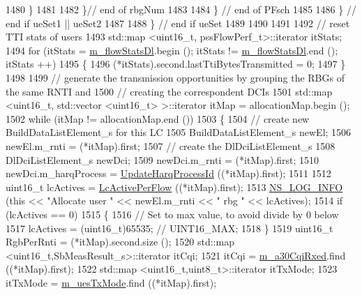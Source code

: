 \begin{DoxyCode}
1480                     \}
1481          
1482                 \}\textcolor{comment}{// end of rbgNum}
1483         
1484             \} \textcolor{comment}{// end of PFsch}
1485 
1486         \} \textcolor{comment}{// end if ueSet1 || ueSet2}
1487     
1488     \} \textcolor{comment}{// end if ueSet}
1489 
1490 
1491 
1492   \textcolor{comment}{// reset TTI stats of users}
1493   std::map <uint16\_t, pssFlowPerf\_t>::iterator itStats;
1494   \textcolor{keywordflow}{for} (itStats = \hyperlink{classns3_1_1PssFfMacScheduler_add144474dc7bd9d89b93ff14bc8d27c9}{m\_flowStatsDl}.begin (); itStats != \hyperlink{classns3_1_1PssFfMacScheduler_add144474dc7bd9d89b93ff14bc8d27c9}{m\_flowStatsDl}.end (); itStats
      ++)
1495     \{
1496       (*itStats).second.lastTtiBytesTransmitted = 0;
1497     \}
1498 
1499   \textcolor{comment}{// generate the transmission opportunities by grouping the RBGs of the same RNTI and}
1500   \textcolor{comment}{// creating the correspondent DCIs}
1501   std::map <uint16\_t, std::vector <uint16\_t> >::iterator itMap = allocationMap.begin ();
1502   \textcolor{keywordflow}{while} (itMap != allocationMap.end ())
1503     \{
1504       \textcolor{comment}{// create new BuildDataListElement\_s for this LC}
1505       BuildDataListElement\_s newEl;
1506       newEl.m\_rnti = (*itMap).first;
1507       \textcolor{comment}{// create the DlDciListElement\_s}
1508       DlDciListElement\_s newDci;
1509       newDci.m\_rnti = (*itMap).first;
1510       newDci.m\_harqProcess = \hyperlink{classns3_1_1PssFfMacScheduler_a5c5fbf9993def2ae6cf974ae81bc0ddb}{UpdateHarqProcessId} ((*itMap).first);
1511 
1512       uint16\_t lcActives = \hyperlink{classns3_1_1PssFfMacScheduler_afa94be0f9d6a6f6ce3aee86abf764e27}{LcActivePerFlow} ((*itMap).first);
1513       \hyperlink{group__logging_gafbd73ee2cf9f26b319f49086d8e860fb}{NS\_LOG\_INFO} (\textcolor{keyword}{this} << \textcolor{stringliteral}{"Allocate user "} << newEl.m\_rnti << \textcolor{stringliteral}{" rbg "} << lcActives);
1514       \textcolor{keywordflow}{if} (lcActives == 0)
1515         \{
1516           \textcolor{comment}{// Set to max value, to avoid divide by 0 below}
1517           lcActives = (uint16\_t)65535; \textcolor{comment}{// UINT16\_MAX;}
1518         \}
1519       uint16\_t RgbPerRnti = (*itMap).second.size ();
1520       std::map <uint16\_t,SbMeasResult\_s>::iterator itCqi;
1521       itCqi = \hyperlink{classns3_1_1PssFfMacScheduler_ab1bc511b7c55ead9b2e8ff1e0d4b0e3b}{m\_a30CqiRxed}.find ((*itMap).first);
1522       std::map <uint16\_t,uint8\_t>::iterator itTxMode;
1523       itTxMode = \hyperlink{classns3_1_1PssFfMacScheduler_a48aa1d9dc22e9c73e3c2206be76bb6cd}{m\_uesTxMode}.find ((*itMap).first);

\end{DoxyCode}
